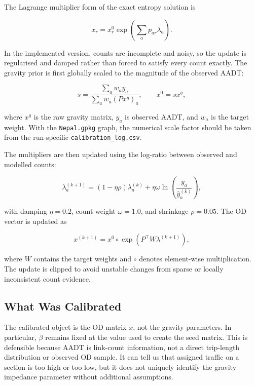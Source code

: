 \documentclass[11pt,a4paper]{article}
\begin{document}
The Lagrange multiplier form of the exact entropy solution is

\begin{equation}
x_r=x^0_r\exp\left(\sum_a p_{ar}\lambda_a\right).
\label{eq:me2_solution}
\end{equation}

In the implemented version, counts are incomplete and noisy, so the update is
regularised and damped rather than forced to satisfy every count exactly. The
gravity prior is first globally scaled to the magnitude of the observed AADT:

\begin{equation}
s=\frac{\sum_a w_a y_a}{\sum_a w_a(Px^g)_a},
\qquad x^0=sx^g,
\label{eq:scale}
\end{equation}

where $x^g$ is the raw gravity matrix, $y_a$ is observed AADT, and $w_a$ is the
target weight. With the \texttt{Nepal.gpkg} graph, the numerical
scale factor should be taken from the run-specific \texttt{calibration\_log.csv}.

The multipliers are then updated using the log-ratio between observed and
modelled counts:

\begin{equation}
\lambda^{(k+1)}_a =
(1-\eta\rho)\lambda^{(k)}_a
+\eta\omega
\ln\left(\frac{y_a}{\hat{y}^{(k)}_a}\right),
\label{eq:lambda_update}
\end{equation}

with damping $\eta=0.2$, count weight $\omega=1.0$, and shrinkage $\rho=0.05$.
The OD vector is updated as

\begin{equation}
x^{(k+1)} =
x^0 \circ
\exp\left(P^\top W\lambda^{(k+1)}\right),
\label{eq:implemented_update}
\end{equation}

where $W$ contains the target weights and $\circ$ denotes element-wise
multiplication. The update is clipped to avoid unstable changes from sparse or
locally inconsistent count evidence.

\subsection{What Was Calibrated}

The calibrated object is the OD matrix $x$, not the gravity parameters. In
particular, $\beta$ remains fixed at the value used to create the seed matrix.
This is defensible because AADT is link-count information, not a direct
trip-length distribution or observed OD sample. It can tell us that assigned
traffic on a section is too high or too low, but it does not uniquely identify
the gravity impedance parameter without additional assumptions.
\end{document}
